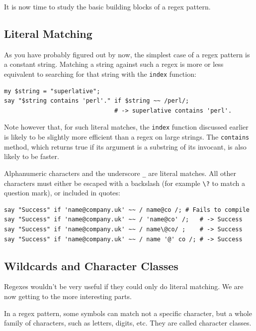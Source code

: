 It is now time to study the basic building blocks of a 
regex pattern.

\subsection{Literal Matching}

As you have probably figured out by now, the simplest case 
of a regex pattern is a constant string. Matching a string 
against such a regex is more or less equivalent to searching 
for that string with the {\tt index} function:

\begin{verbatim}
my $string = "superlative";
say "$string contains 'perl'." if $string ~~ /perl/;
                               # -> superlative contains 'perl'.
\end{verbatim}
%

Note however that, for such literal matches, the {\tt index} 
function discussed earlier is likely to be slightly more 
efficient than a regex on large strings. The {\tt contains} 
method, which returns true if its argument is a substring of 
its invocant, is also likely to be faster.

Alphanumeric characters and the underscore \verb'_' are literal 
matches. All other characters must either be escaped with a 
backslash (for example \verb'\?' to match a question mark), 
or included in quotes:

\begin{verbatim}
say "Success" if 'name@company.uk' ~~ / name@co /; # Fails to compile
say "Success" if 'name@company.uk' ~~ / 'name@co' /;   # -> Success
say "Success" if 'name@company.uk' ~~ / name\@co/ ;    # -> Success
say "Success" if 'name@company.uk' ~~ / name '@' co /; # -> Success
\end{verbatim}
%


\subsection{Wildcards and Character Classes}

Regexes wouldn't be very useful if they could only do literal 
matching. We are now getting to the more interesting parts.

In a regex pattern, some symbols can match not a specific character, 
but a whole family of characters, such as letters, digits, etc. 
They are called character classes.

